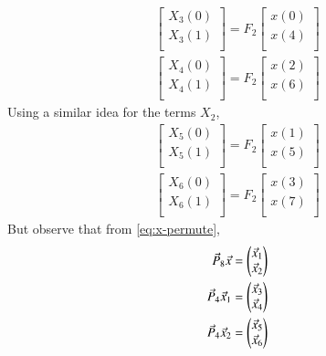 \documentclass[journal,12pt,twocolumn]{IEEEtran}
\renewcommand\thesection{\arabic{section}}
\begin{document}
\begin{enumerate}[label=\thesection.\arabic*]
\begin{enumerate}[label=\arabic*.,ref=\thesection.\theenumi]
\begin{align}
	\begin{bmatrix}
		X_{3}(0) \\ 
		X_{3}(1)\\ 
	\end{bmatrix}
	= F_{2}
	\begin{bmatrix}
		x(0) \\ 
		x(4) \\ 
	\end{bmatrix} \\
	\begin{bmatrix}
		X_{4}(0) \\ 
		X_{4}(1)\\ 
	\end{bmatrix}
	= F_{2}
	\begin{bmatrix}
		x(2) \\ 
		x(6) \\ 
	\end{bmatrix}
\end{align}
Using a similar idea for the terms $X_2$, 
\begin{align}
	\begin{bmatrix}
		X_{5}(0) \\ 
		X_{5}(1)\\ 
	\end{bmatrix}
	= F_{2}
	\begin{bmatrix}
		x(1) \\ 
		x(5) \\ 
	\end{bmatrix} \\
	\begin{bmatrix}
		X_{6}(0) \\ 
		X_{6}(1)\\ 
	\end{bmatrix}
	= F_{2}
	\begin{bmatrix}
		x(3) \\ 
		x(7) \\ 
	\end{bmatrix}
\end{align}
But observe that from \eqref{eq:x-permute},
\begin{align}
	\vec{P}_8\vec{x} &= \begin{pmatrix}\vec{x}_1\\\vec{x}_2\end{pmatrix} \\
	\vec{P}_4\vec{x}_1 &= \begin{pmatrix}\vec{x}_3\\\vec{x}_4\end{pmatrix} \\ 
	\vec{P}_4\vec{x}_2 &= \begin{pmatrix}\vec{x}_5\\\vec{x}_6\end{pmatrix}
\end{align}

\end{enumerate}
\end{enumerate}
\end{document}

